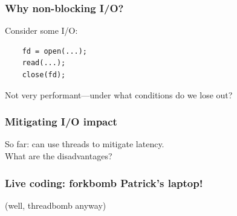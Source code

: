 \documentclass[aspectratio=43]{beamer}
\newenvironment{changemargin}[1]{%
  \begin{list}{}{%
    \setlength{\topsep}{0pt}%
    \setlength{\leftmargin}{#1}%
    \setlength{\rightmargin}{1em}
    \setlength{\listparindent}{\parindent}%
    \setlength{\itemindent}{\parindent}%
    \setlength{\parsep}{\parskip}%
  }%
  \item[]}{\end{list}}
\begin{document}
\begin{frame}[fragile]
  \frametitle{Why non-blocking I/O?}
  \begin{changemargin}{2em}
  Consider some I/O:

\begin{changemargin}{3em}
\begin{minipage}{.5\textwidth}
\begin{lstlisting}
    fd = open(...);
    read(...);
    close(fd);
  \end{lstlisting}
\end{minipage}
\end{changemargin}

  Not very performant---under what conditions do we lose out?
  \end{changemargin}
\end{frame}

\begin{frame}[fragile]
  \frametitle{Mitigating I/O impact}
  \begin{changemargin}{2em}
    So far: can use threads to mitigate latency.\\

    What are the disadvantages?
  \end{changemargin}
\end{frame}

\begin{frame}[fragile]
  \frametitle{Live coding: forkbomb Patrick's laptop!}

\begin{center}
(well, threadbomb anyway)
\end{center}

\end{frame}
\end{document}
